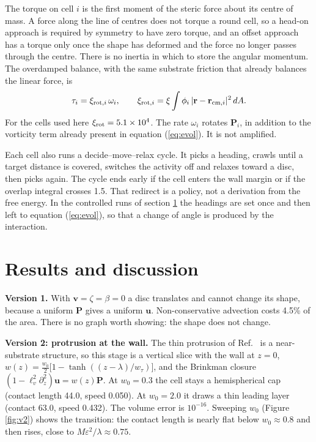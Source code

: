 \documentclass[11pt]{article}
\begin{document}
The torque on cell $i$ is the first moment of the steric force about its centre of mass. A force along the line of centres does not torque a round cell, so a head-on approach is required by symmetry to have zero torque, and an offset approach has a torque only once the shape has deformed and the force no longer passes through the centre. There is no inertia in which to store the angular momentum. The overdamped balance, with the same substrate friction that already balances the linear force, is
\begin{equation}\label{eq:torque}
\tau_{i}=\xi_{{\rm rot},i}\,\omega_{i},\qquad
\xi_{{\rm rot},i}=\xi\int\phi_{i}\,|\mathbf{r}-\mathbf{r}_{{\rm cm},i}|^{2}\,dA.
\end{equation}
For the cells used here $\xi_{\rm rot}=5.1\times 10^{4}$. The rate $\omega_{i}$ rotates $\mathbf{P}_{i}$, in addition to the vorticity term already present in equation (\ref{eq:evol}). It is not amplified.

Each cell also runs a decide--move--relax cycle. It picks a heading, crawls until a target distance is covered, switches the activity off and relaxes toward a disc, then picks again. The cycle ends early if the cell enters the wall margin or if the overlap integral crosses 1.5. That redirect is a policy, not a derivation from the free energy. In the controlled runs of section \ref{sec:results} the headings are set once and then left to equation (\ref{eq:evol}), so that a change of angle is produced by the interaction.

\section{Results and discussion}
\label{sec:results}

\noindent
\textbf{Version 1.} With $\mathbf{v}=\zeta=\beta=0$ a disc translates and cannot change its shape, because a uniform $\mathbf{P}$ gives a uniform $\mathbf{u}$. Non-conservative advection costs 4.5\% of the area. There is no graph worth showing: the shape does not change.

\textbf{Version 2: protrusion at the wall.}
The thin protrusion of Ref.~\cite{Tjhung:2015} is a near-substrate structure, so this stage is a vertical slice with the wall at $z=0$,
$w(z)=\frac{w_{0}}{2}\bigl[1-\tanh((z-\lambda)/w_{\tau})\bigr]$,
and the Brinkman closure $(1-\ell_{v}^{2}\partial_{z}^{2})\mathbf{u}=w(z)\mathbf{P}$.
At $w_{0}=0.3$ the cell stays a hemispherical cap (contact length 44.0, speed 0.050). At $w_{0}=2.0$ it draws a thin leading layer (contact 63.0, speed 0.432). The volume error is $10^{-16}$. Sweeping $w_{0}$ (Figure \ref{fig:v2}) shows the transition: the contact length is nearly flat below $w_{0}\approx 0.8$ and then rises, close to $M\varepsilon^{2}/\lambda\approx 0.75$.
\end{document}
